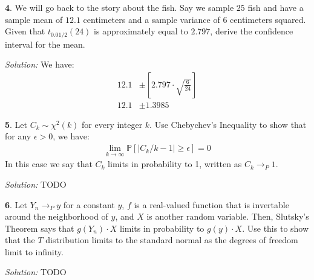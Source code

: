 \documentclass{tufte-handout}
\begin{document}
\textbf{4}. We will go back to the story about the fish. Say we sample $25$ fish and
have a sample mean of $12.1$ centimeters and a sample variance of $6$
centimeters squared. Given that $t_{0.01/2}(24)$ is approximately equal
to $2.797$, derive the confidence interval for the mean.


\textit{Solution:} We have:
\begin{align*}
12.1 &\pm \left[ 2.797 \cdot \sqrt{\frac{6}{24}} \right] \\
12.1 &\pm 1.3985
\end{align*}

\textbf{5}. Let $C_k \sim \chi^2(k)$ for every integer $k$. Use Chebychev's Inequality to show
that for any $\epsilon > 0$, we have:
\begin{align*}
\lim_{k \rightarrow \infty} \mathbb{P} \left[ |C_k/k - 1| \geq \epsilon \right] = 0
\end{align*}
In this case we say that $C_k$ limits in probability to 1, written as
$C_k \rightarrow_P 1$.

\textit{Solution:} TODO

\textbf{6}. Let $Y_n \rightarrow_P y$ for a constant $y$, $f$ is a real-valued function that
is invertable around the neighborhood of $y$, and $X$ is another random variable.
Then, Slutsky's Theorem says that $g(Y_n) \cdot X$ limits in probability to
$g(y) \cdot X$. Use this to show that the $T$ distribution limits to the standard
normal as the degrees of freedom limit to infinity.

\textit{Solution:} TODO
\end{document}

